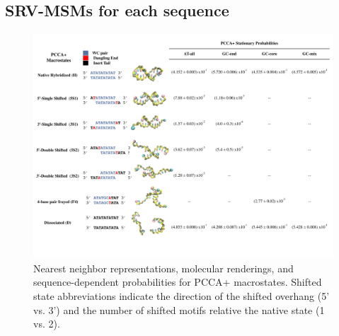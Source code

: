 \documentclass[journal=jpcbfk,manuscript=article]{achemso}
\begin{document}
\subsection{SRV-MSMs for each sequence}

\begin{figure}[ht!]
	\begin{center}
        \includegraphics[width=160mm, 
        scale=1]{Fig3.pdf}
        \caption{Nearest neighbor representations, molecular renderings, and sequence-dependent probabilities for PCCA+ macrostates. Shifted state abbreviations indicate the direction of the shifted overhang (5' vs. 3') and the number of shifted motifs relative the native state (1 vs. 2).}
        \label{fig:allseq_table}
	\end{center}
\end{figure}
\end{document}
